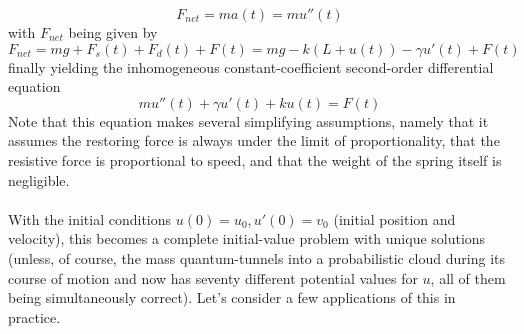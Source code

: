 \documentclass{article}
\begin{document}
\begin{equation*}
    F_{net} = ma(t) = mu''(t)
\end{equation*}
with $F_{net}$ being given by
\begin{equation*}
    F_{net} = mg + F_s(t) + F_d(t) + F(t) = mg - k(L+u(t)) - \gamma u'(t) + F(t)
\end{equation*}
finally yielding the inhomogeneous constant-coefficient second-order differential equation
\begin{equation*}
    mu''(t) + \gamma u'(t) + ku(t) = F(t)
\end{equation*}
Note that this equation makes several simplifying assumptions, namely that it assumes the restoring force is always under the limit of proportionality, that the resistive force is proportional to speed, and that the weight of the spring itself is negligible. \\ \\
With the initial conditions $u(0) = u_0, u'(0) = v_0$ (initial position and velocity), this becomes a complete initial-value problem with unique solutions (unless, of course, the mass quantum-tunnels into a probabilistic cloud during its course of motion and now has seventy different potential values for $u$, all of them being simultaneously correct). Let's consider a few applications of this in practice.
\end{document}
